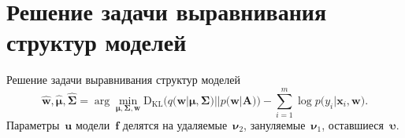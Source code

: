 \documentclass[10pt,pdf,hyperref={unicode}]{beamer}
\begin{document}
\section{Решение задачи выравнивания структур моделей}
\justifying
\begin{frame}{Решение задачи выравнивания структур моделей}\vspace{-.4cm}
\[
\hat{\mathbf{w}}, \hat{\bm{\mu}}, \hat{\bm{\Sigma}} = \arg \min_{\bm{\mu}, \bm{\Sigma}, \mathbf{w}} \text{D}_{\text{KL}}\bigr(q\bigr(\mathbf{w}|\bm{\mu}, \bm{\Sigma}\bigr)||p\bigr(\mathbf{w}|\mathbf{A}\bigr)\bigr) - \sum_{i=1}^{m}\log p\bigr(y_i|\mathbf{x}_{i}, \mathbf{w}\bigr).
\]
Параметры~$\mathbf{u}$ модели~$\mathbf{f}$ делятся на {\color{red} удаляемые~$\bm{\nu}_2$}, {\color{blue} зануляемые~$\bm{\nu}_1$}, {оставшиеся~$\bm{\upsilon}$}.


\end{frame}
\end{document}
